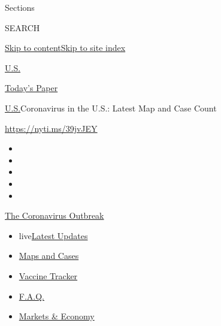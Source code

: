 Sections

SEARCH

\protect\hyperlink{site-content}{Skip to
content}\protect\hyperlink{site-index}{Skip to site index}

\href{https://www.nytimes.com/section/us}{U.S.}

\href{https://myaccount.nytimes.com/auth/login?response_type=cookie\&client_id=vi}{}

\href{https://www.nytimes.com/section/todayspaper}{Today's Paper}

\href{/section/us}{U.S.}\textbar{}Coronavirus in the U.S.: Latest Map
and Case Count

\href{https://nyti.ms/39jvJEY}{https://nyti.ms/39jvJEY}

\begin{itemize}
\item
\item
\item
\item
\item
\end{itemize}

\href{https://www.nytimes.com/news-event/coronavirus?action=click\&pgtype=Article\&state=default\&region=TOP_BANNER\&context=storylines_menu}{The
Coronavirus Outbreak}

\begin{itemize}
\tightlist
\item
  live\href{https://www.nytimes.com/2020/08/08/world/coronavirus-updates.html?action=click\&pgtype=Article\&state=default\&region=TOP_BANNER\&context=storylines_menu}{Latest
  Updates}
\item
  \href{https://www.nytimes.com/interactive/2020/us/coronavirus-us-cases.html?action=click\&pgtype=Article\&state=default\&region=TOP_BANNER\&context=storylines_menu}{Maps
  and Cases}
\item
  \href{https://www.nytimes.com/interactive/2020/science/coronavirus-vaccine-tracker.html?action=click\&pgtype=Article\&state=default\&region=TOP_BANNER\&context=storylines_menu}{Vaccine
  Tracker}
\item
  \href{https://www.nytimes.com/interactive/2020/world/coronavirus-tips-advice.html?action=click\&pgtype=Article\&state=default\&region=TOP_BANNER\&context=storylines_menu}{F.A.Q.}
\item
  \href{https://www.nytimes.com/live/2020/08/07/business/stock-market-today-coronavirus?action=click\&pgtype=Article\&state=default\&region=TOP_BANNER\&context=storylines_menu}{Markets
  \& Economy}
\end{itemize}

